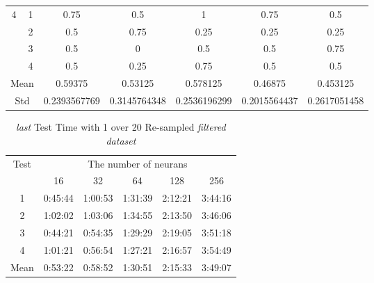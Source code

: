 \documentclass[draft,dvipsnames]{drexel-thesis}
\begin{document}
\begin{thesis}
\begin{table}[!t]
\begin{tabular}{|c|c|c|c|c|c|c|}
\multirow{4}{*}{4}    & 1                   & 0.75         & 0.5          & 1            & 0.75         & 0.5          \\ \cline{2-7}
                      & 2                   & 0.5          & 0.75         & 0.25         & 0.25         & 0.25         \\ \cline{2-7}
                      & 3                   & 0.5          & 0            & 0.5          & 0.5          & 0.75         \\ \cline{2-7}
                      & 4                   & 0.5          & 0.25         & 0.75         & 0.5          & 0.5          \\ \hline
\multicolumn{2}{|c|}{Mean}                  & 0.59375      & 0.53125      & 0.578125     & 0.46875      & 0.453125     \\ \hline
\multicolumn{2}{|c|}{Std}                   & 0.2393567769 & 0.3145764348 & 0.2536196299 & 0.2015564437 & 0.2617051458 \\ \hline
\end{tabular}
\end{table}

\begin{table}[!t]
\centering
\caption{{\em last} Test Time with 1 over 20 Re-sampled {\em filtered dataset}}
\label{tbl:last_1_20_time}
\begin{tabular}{|c|c|c|c|c|c|}
\hline
\multirow{2}{*}{Test}      & \multicolumn{5}{c|}{The number of neurans}                                                                                                               \\ \cline{2-6}
                           & 16                           & 32                           & 64                           & 128                          & 256                          \\ \hline
1                          & 0:45:44                      & 1:00:53                      & 1:31:39                      & 2:12:21                      & 3:44:16                      \\ \hline
2                          & 1:02:02                      & 1:03:06                      & 1:34:55                      & 2:13:50                      & 3:46:06                      \\ \hline
3                          & 0:44:21                      & 0:54:35                      & 1:29:29                      & 2:19:05                      & 3:51:18                      \\ \hline
4                          & 1:01:21                      & 0:56:54                      & 1:27:21                      & 2:16:57                      & 3:54:49                      \\ \hline
\multicolumn{1}{|l|}{Mean} & \multicolumn{1}{l|}{0:53:22} & \multicolumn{1}{l|}{0:58:52} & \multicolumn{1}{l|}{1:30:51} & \multicolumn{1}{l|}{2:15:33} & \multicolumn{1}{l|}{3:49:07} \\ \hline
\end{tabular}
\end{table}


\end{thesis}
\end{document}
